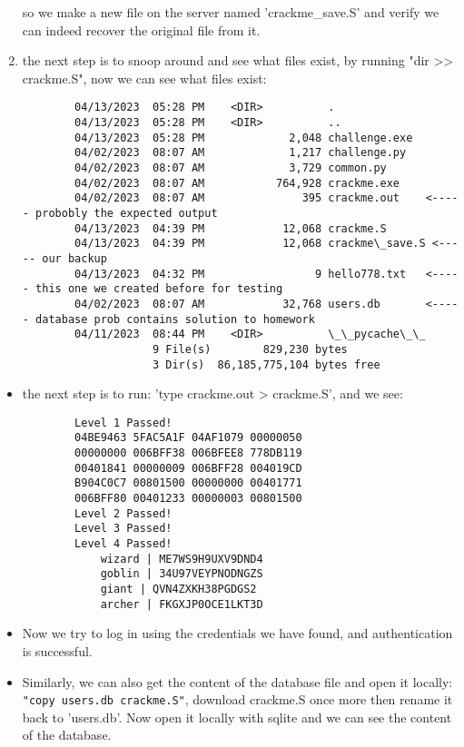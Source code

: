 \documentclass{article}
\begin{document}
\begin{enumerate}
		so we make a new file on the server named 'crackme\_save.S' and verify we can indeed recover the original file from it.
	\item the next step is to snoop around and see what files exist, by running "dir >> crackme.S", now we can see what files exist:
	\begin{small}\begin{verbatim}
        04/13/2023  05:28 PM    <DIR>          .
		04/13/2023  05:28 PM    <DIR>          ..
		04/13/2023  05:28 PM             2,048 challenge.exe
		04/02/2023  08:07 AM             1,217 challenge.py
		04/02/2023  08:07 AM             3,729 common.py
		04/02/2023  08:07 AM           764,928 crackme.exe
		04/02/2023  08:07 AM               395 crackme.out    <----- probobly the expected output
		04/13/2023  04:39 PM            12,068 crackme.S
		04/13/2023  04:39 PM            12,068 crackme\_save.S <----- our backup
		04/13/2023  04:32 PM                 9 hello778.txt   <----- this one we created before for testing
		04/02/2023  08:07 AM            32,768 users.db       <----- database prob contains solution to homework
		04/11/2023  08:44 PM    <DIR>          \_\_pycache\_\_
					9 File(s)        829,230 bytes
					3 Dir(s)  86,185,775,104 bytes free
    \end{verbatim}\end{small}
\end{enumerate}
\begin{itemize}
    \item the next step is to run: 'type crackme.out > crackme.S', and we see:
	\begin{small}\begin{verbatim}
		Level 1 Passed!
		04BE9463 5FAC5A1F 04AF1079 00000050 
		00000000 006BFF38 006BFEE8 778DB119 
		00401841 00000009 006BFF28 004019CD 
		B904C0C7 00801500 00000000 00401771 
		006BFF80 00401233 00000003 00801500 
		Level 2 Passed!
		Level 3 Passed!
		Level 4 Passed!
		    wizard | ME7WS9H9UXV9DND4
		    goblin | 34U97VEYPNODNGZS
			giant | QVN4ZXKH38PGDGS2	
		    archer | FKGXJP0OCE1LKT3D
    \end{verbatim}\end{small}
	\item Now we try to log in using the credentials we have found, and authentication is successful.
	\item Similarly, we can also get the content of the database file and open it locally: \texttt{"copy users.db crackme.S"},
		download crackme.S once more then rename it back to 'users.db'. Now open it locally with sqlite and we
		can see the content of the database.
\end{itemize}
\end{document}
